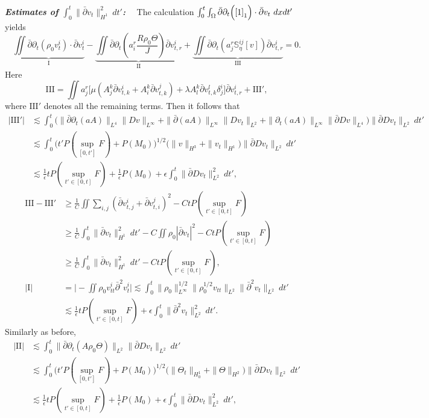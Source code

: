 \documentclass[12pt,a4paper]{amsart}
\numberwithin{equation}{section}
\theoremstyle{plain}
\theoremstyle{definition}
\newcommand{\bpartial}{\bar{\partial}}
\begin{document}
\textsl{\textbf{Estimates of $\int_{0}^{t}\|\bpartial v_{t}\|_{H^1}^2\ dt'$:}}~~
The calculation
$\int_{0}^{t}\int_{\Omega}\bpartial\partial_t \Big(\eqref{1}_1\Big)\cdot \bpartial v_{t}\ dx dt'$ yields
$$
\underbrace{\iint \bpartial \partial_t (\rho_0 v_t^i) \cdot \bpartial v_t^i}_{\mathrm{I}} 
-\underbrace{\iint \bpartial \partial_t (a^r_i\frac{R\rho_0\Theta}{J})\bpartial v^i_{t,r}}_{\mathrm{II}}
+\underbrace{\iint \bpartial\partial_t (a^r_j\mathbb{S}^{ij}_{\eta}[v])\bpartial v^i_{t,r}}_{\mathrm{III}}=0.
$$
Here
$$
\mathrm{III}=\iint a^r_j\Big[\mu (A^{k}_j \bpartial v^i_{t,k}+A^k_i \bpartial v^j_{t,k})+\lambda A_l^k \bpartial v^l_{t,k}\delta^i_j\Big]\bpartial v^i_{t,r}+\mathrm{III}',
$$
where $\mathrm{III}'$ denotes all the remaining terms. Then it follows that
\begin{align*}
|\mathrm{III}'|
&\lesssim \int_{0}^{t}\Big(\|\bpartial\partial_t (aA)\|_{L^4}\|Dv\|_{L^{\infty}}
    +\|\bpartial (aA)\|_{L^{\infty}}\|Dv_t\|_{L^2}
    +\|\partial_t (aA)\|_{L^{\infty}}\|\bpartial Dv\|_{L^4}\Big)
    \|\bpartial Dv_t\|_{L^2}\ dt'\\
&\lesssim \int_{0}^{t} \Big( t'P(\sup\limits_{[0,t']}F)+P(M_0)  \Big)^{1/2} \Big(\|v\|_{H^3}+\|v_t\|_{H^1}\Big)\|\bpartial Dv_t\|_{L^2} \ dt'\\
&\lesssim \frac{1}{\epsilon}tP(\sup\limits_{t'\in[0,t]}F)+\frac{1}{\epsilon}P( M_0 )+\epsilon \int_{0}^{t}\|\bpartial Dv_t\|_{L^2}^2\ dt',
\end{align*}
\begin{align*}
\mathrm{III}-\mathrm{III}'&\geq\frac{1}{C}\iint\sum\limits_{i,j}(\bpartial v^i_{t,j}+\bpartial v^j_{t,i})^2 -CtP(\sup\limits_{t'\in[0,t]}F)\\
&\geq \frac{1}{C}\int_{0}^{t}\|\bpartial v_t\|_{H^1}^2\ dt'-C\iint \rho_0 |\bpartial v_t|^2-CtP(\sup\limits_{t'\in[0,t]}F)\\
&\geq \frac{1}{C}\int_{0}^{t}\|\bpartial v_t\|_{H^1}^2\ dt'-CtP(\sup\limits_{t'\in[0,t]}F),\\
|\mathrm{I}|&=\Big|-\iint \rho_0 v^i_{tt} \bpartial^2v^i_t \Big|
\lesssim \int_{0}^{t} \|\rho_0\|_{L^{\infty}}^{1/2} \|\rho_0^{1/2}v_{tt}\|_{L^2} \|\bpartial^2 v_t\|_{L^2} \ dt'\\
&\lesssim \frac{1}{\epsilon}tP(\sup\limits_{t'\in[0,t]}F)+\epsilon \int_{0}^{t}\|\bpartial^2 v_t\|_{L^2}^2\ dt'. 
\end{align*}
Similarly as before,
\begin{align*}
|\mathrm{II}|
&\lesssim\int_{0}^{t} \| \bpartial \partial_t (A\rho_0\Theta)\|_{L^2} \|\bpartial Dv_t\|_{L^2} \ dt' \\
&\lesssim\int_{0}^{t} \Big( t'P(\sup\limits_{[0,t']}F)+P(M_0)  \Big)^{1/2} \Big(\|\Theta_t\|_{H_0^1}+\|\Theta\|_{H^2}\Big)\|\bpartial Dv_t\|_{L^2} \ dt' \\
&\lesssim \frac{1}{\epsilon}tP(\sup\limits_{t'\in[0,t]}F)+\frac{1}{\epsilon} P(M_0) +\epsilon \int_{0}^{t}\|\bpartial Dv_t\|_{L^2}^2\ dt',
\end{align*}
\end{document}
